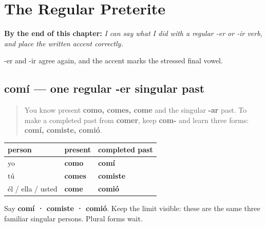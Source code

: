 
\chapter{The Regular Preterite}
\label{ch:spanish-preterito-regular}

\begin{chapteropening}
\textbf{By the end of this chapter:} \emph{I can say what I did with a regular -er or -ir verb, and place the written accent correctly.}

-er and -ir agree again, and the accent marks the stressed final vowel.
\end{chapteropening}

\section[comí]{comí — one regular -er singular past}

\label{lesson:ES-C15-comer-preterite}



\begin{quote}
You know present \textbf{como, comes, come} and the singular \textbf{-ar} past. To make a completed past from \textbf{comer}, keep \textbf{com-} and learn three forms: \textbf{comí, comiste, comió}.
\end{quote}

\begin{grammarlens}[title={Grammar Lens: present beside completed past}]
\noindent
\begin{tabularx}{\linewidth}{@{}>{\raggedright\arraybackslash}X>{\raggedright\arraybackslash}X>{\raggedright\arraybackslash}X@{}}
\toprule
\textbf{person} & \textbf{present} & \textbf{completed past} \\
\midrule
yo & \textbf{como} & \textbf{comí} \\
tú & \textbf{comes} & \textbf{comiste} \\
él / ella / usted & \textbf{come} & \textbf{comió} \\
\bottomrule
\end{tabularx}

Say \textbf{comí · comiste · comió}. Keep the limit visible: these are the same three familiar singular persons. Plural forms wait.
\end{grammarlens}

